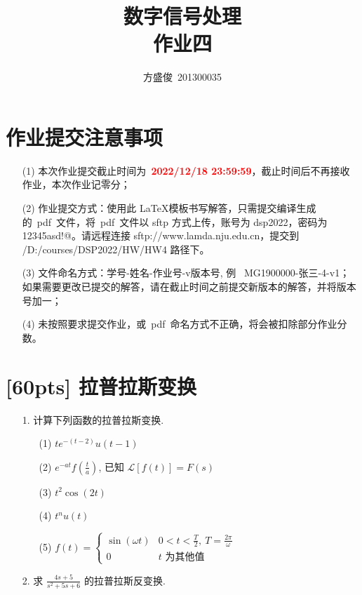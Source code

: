 \documentclass[a4paper,UTF8]{article}
\numberwithin{equation}{section}
\begin{document}
	
	\title{数字信号处理\\
		作业四}
	\author{方盛俊\, 201300035} 
	\maketitle
	
	\section*{作业提交注意事项}
	\begin{tcolorbox}
		\begin{enumerate}
			\item[(1)] 本次作业提交截止时间为~\textcolor{red}{\textbf{2022/12/18  23:59:59}}，截止时间后不再接收作业，本次作业记零分；
			\item[(2)] 作业提交方式：使用此 \LaTeX 模板书写解答，只需提交编译生成的~pdf~文件，将~pdf~文件以 sftp 方式上传，账号为 dsp2022，密码为 12345asd!@。请远程连接 sftp://www.lamda.nju.edu.cn，提交到 /D:/courses/DSP2022/HW/HW4 路径下。
			\item[(3)] 文件命名方式：学号-姓名-作业号-v版本号, 例~ MG1900000-张三-4-v1；如果需要更改已提交的解答，请在截止时间之前提交新版本的解答，并将版本号加一；
			\item[(4)] 未按照要求提交作业，或~pdf~命名方式不正确，将会被扣除部分作业分数。
		\end{enumerate}
	\end{tcolorbox}
	
	
	\newpage
	\section{[60pts] 拉普拉斯变换}
	\begin{itemize}
		\item[1.]计算下列函数的拉普拉斯变换.
		\begin{itemize}
			\item[(1)]$ te^{-(t-2)}u(t-1) $
			\item[(2)]$ e^{-at}f\!\left(\frac{t}{a}\right) $, 已知 $\mathcal{L}[f(t)]=F(s)$
			\item[(3)]$ t^2\cos(2t) $
			\item[(4)]$ t^nu(t) $
			\item[(5)]$ f(t)=\left\{\begin{array}{ll}
				\sin (\omega t) & 0<t<\frac{T}{2},\ T=\frac{2 \pi}{\omega} \\
				0 & t \text { 为其他值 }
			\end{array} \right. $
		\end{itemize}
		
		\item[2.]求 $ \displaystyle \frac{4s+5}{s^2+5s+6} $ 的拉普拉斯反变换.
	\end{itemize}
	
\end{document}
